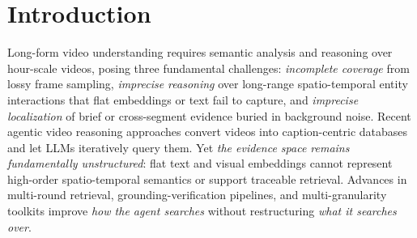 \documentclass[sigconf, screen, review, anonymous]{acmart}
\begin{document}


\maketitle


\section{Introduction}
\label{sec:intro}



Long-form video understanding requires semantic analysis and reasoning over
hour-scale videos, posing three fundamental challenges: \emph{incomplete
coverage} from lossy frame sampling, \emph{imprecise reasoning} over
long-range spatio-temporal entity interactions that flat embeddings or text
fail to capture, and \emph{imprecise localization} of brief or
cross-segment evidence buried in background noise.
Recent agentic video reasoning approaches\cite{deepvideo2025,videoagent,drvideo2025} convert videos
into caption-centric databases and let LLMs iteratively query them. Yet
\emph{the evidence space remains fundamentally unstructured}: flat text and
visual embeddings cannot represent high-order spatio-temporal semantics or
support traceable retrieval. Advances in multi-round retrieval\cite{videoagent},
grounding-verification pipelines\cite{videomind}, and multi-granularity
toolkits\cite{videoseek} improve \emph{how the agent searches} without
restructuring \emph{what it searches over}.

\end{document}
